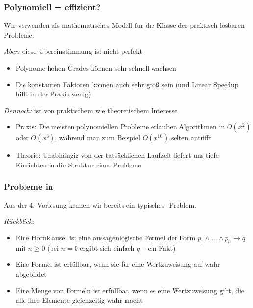 \documentclass[aspectratio=1610,onlymath]{beamer}
\begin{document}
\begin{frame}\frametitle{Polynomiell = effizient?}

Wir verwenden  als mathematisches Modell für die Klasse
der praktisch lösbaren Probleme.
\bigskip

\emph{Aber:} diese Übereinstimmung ist nicht perfekt
\begin{itemize}
\item Polynome hohen Grades können sehr schnell wachsen
\item Die konstanten Faktoren können auch sehr groß sein (und Linear Speedup hilft in der Praxis wenig)
\end{itemize}\bigskip\pause

\emph{Dennoch:}  ist von praktischem wie theoretischem Interesse
\begin{itemize}
\item \alert{Praxis:} Die meisten polynomiellen Probleme erlauben Algorithmen in $O(x^2)$ oder $O(x^3)$, während man zum Beispiel $O(x^{10})$ selten antrifft
\item \alert{Theorie:} Unabhängig von der tatsächlichen Laufzeit liefert uns  tiefe Einsichten in die Struktur eines Problems
\end{itemize}

\end{frame}

\begin{frame}\frametitle{Probleme in }

Aus der 4. Vorlesung kennen wir bereits ein typisches -Problem.\bigskip

\emph{Rückblick:}
\begin{itemize}
\item Eine \alert{Hornklausel} ist eine aussagenlogische Formel der Form $p_1\wedge\ldots\wedge p_n\to q$ mit $n\geq 0$
{\tiny (bei $n=0$ ergibt sich einfach $q$ -- ein \alert{Fakt})}
\item Eine Formel ist \alert{erfüllbar}, wenn sie für eine Wertzuweisung auf wahr abgebildet 
\item Eine Menge von Formeln ist erfüllbar, wenn es eine Wertzuweisung gibt, die alle
ihre Elemente gleichzeitig wahr macht
\end{itemize}\bigskip


\end{frame}
\end{document}
